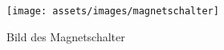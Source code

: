 

\begin{figure}[ht]
    \begin{center}
      \texttt{[image: assets/images/magnetschalter]}
    \end{center}
    \vspace{-3ex}
    \caption{Bild des Magnetschalter}
    \label{fig:magnetschalter}
  \end{figure}